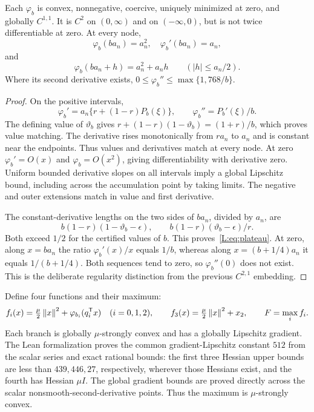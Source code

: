 \begin{lemma}\label{L:lem:scalar}
Each $\varphi_b$ is convex, nonnegative, coercive, uniquely minimized at zero, and globally $C^{1,1}$. It is $C^2$ on $(0,\infty)$ and on $(-\infty,0)$, but is not twice differentiable at zero. At every node,
\[
 \varphi_b(ba_n)=a_n^2,\quad \varphi_b'(ba_n)=a_n,
\]
and
\begin{equation}\label{L:eq:plateau}
 \varphi_b(ba_n+h)=a_n^2+a_nh\qquad (|h|\le a_n/2).
\end{equation}
Where its second derivative exists, $0\le\varphi_b''\le\max\{1,768/b\}$.
\end{lemma}
\begin{proof}
On the positive intervals,
\[
 \varphi_b'=a_n\{r+(1-r)P_b(\xi)\},\qquad
 \varphi_b''=P_b'(\xi)/b.
\]
The defining value of $\vartheta_b$ gives
$r+(1-r)(1-\vartheta_b)=(1+r)/b$, which proves value matching. The derivative rises monotonically from $ra_n$ to $a_n$ and is constant near the endpoints. Thus values and derivatives match at every node. At zero $\varphi_b'=O(x)$ and $\varphi_b=O(x^2)$, giving differentiability with derivative zero. Uniform bounded derivative slopes on all intervals imply a global Lipschitz bound, including across the accumulation point by taking limits. The negative and outer extensions match in value and first derivative.

The constant-derivative lengths on the two sides of $ba_n$, divided by $a_n$, are
\[
 b(1-r)(1-\vartheta_b-\epsilon),\qquad
 b(1-r)(\vartheta_b-\epsilon)/r.
\]
Both exceed $1/2$ for the certified values of $b$. This proves~\eqref{L:eq:plateau}. At zero, along $x=ba_n$ the ratio $\varphi_b'(x)/x$ equals $1/b$, whereas along $x=(b+1/4)a_n$ it equals $1/(b+1/4)$. Both sequences tend to zero, so $\varphi_b''(0)$ does not exist. This is the deliberate regularity distinction from the previous $C^{2,1}$ embedding.
\end{proof}

Define four functions and their maximum:
\begin{equation}\label{L:eq:embedding}
 f_i(x)=\tfrac\mu2\left\lVert x\right\rVert^2+\varphi_{b_i}(q_i^{\mathsf T} x)\quad (i=0,1,2),\qquad
 f_3(x)=\tfrac\mu2\left\lVert x\right\rVert^2+x_2,\qquad F=\max_i f_i.
\end{equation}
Each branch is globally $\mu$-strongly convex and has a globally Lipschitz gradient. The Lean formalization proves the common gradient-Lipschitz constant $512$ from the scalar series and exact rational bounds: the first three Hessian upper bounds are less than $439,446,27$, respectively, wherever those Hessians exist, and the fourth has Hessian $\mu I$. The global gradient bounds are proved directly across the scalar nonsmooth-second-derivative points. Thus the maximum is $\mu$-strongly convex.

